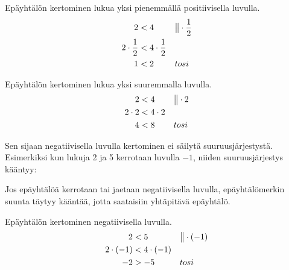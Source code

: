 \begin{esimerkki}
Epäyhtälön kertominen lukua yksi pienemmällä positiivisella luvulla.
\begin{align*}
     2 &< 4 && \big\| \cdot \frac{1}{2} \\
   2\cdot\frac{1}{2} &< 4\cdot\frac{1}{2}  \\
     1 &< 2 && tosi
\end{align*}
\end{esimerkki}

\begin{esimerkki}
Epäyhtälön kertominen lukua yksi suuremmalla luvulla.
\begin{align*}
     2 &< 4 && \big\| \cdot 2 \\
   2\cdot 2 &< 4\cdot 2  \\
     4 &< 8 && tosi
\end{align*}
\end{esimerkki}

Sen sijaan negatiivisella luvulla kertominen ei säilytä suuruusjärjestystä. Esimerkiksi kun lukuja 2 ja 5 kerrotaan luvulla $-1$, niiden suuruusjärjestys kääntyy:

\begin{lukusuora}{-6}{6}{12}

\lukusuorauusi
\end{lukusuora}

Jos epäyhtälöä kerrotaan tai jaetaan negatiivisella luvulla, epäyhtälömerkin suunta täytyy kääntää, jotta saataisiin yhtäpitävä epäyhtälö.

\begin{esimerkki}
Epäyhtälön kertominen negatiivisella luvulla.
\begin{align*}
     2 &< 5 && \big\| \cdot (-1) \\
   2\cdot (-1) &< 4\cdot (-1)  \\
     -2 &> -5 && tosi
\end{align*}
\end{esimerkki}


